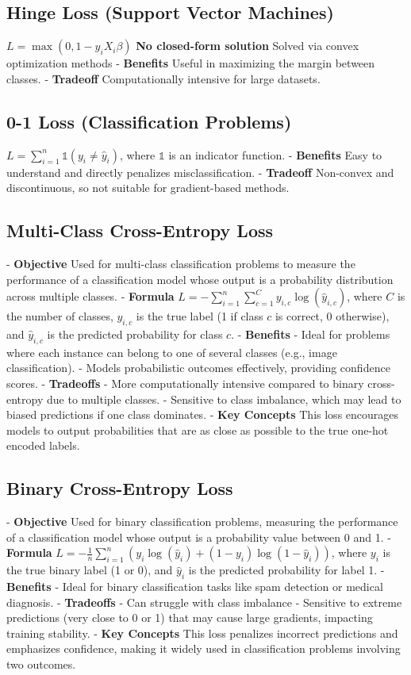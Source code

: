 \documentclass[10pt]{article}
\begin{document}
\begin{multicols}{2}
\subsection*{Hinge Loss (Support Vector Machines)}
$L = \max(0, 1 - y_i X_i \beta)$
\textbf{No closed-form solution} Solved via convex optimization methods
- \textbf{Benefits} Useful in maximizing the margin between classes.
- \textbf{Tradeoff} Computationally intensive for large datasets.

\subsection*{0-1 Loss (Classification Problems)}
$L = \sum_{i=1}^{n} \mathbb{1}(y_i \neq \hat{y}_i)$, where $\mathbb{1}$ is an indicator function.
- \textbf{Benefits} Easy to understand and directly penalizes misclassification.
- \textbf{Tradeoff} Non-convex and discontinuous, so not suitable for gradient-based methods.

\subsection*{Multi-Class Cross-Entropy Loss}
- \textbf{Objective} Used for multi-class classification problems to measure the performance of a classification model whose output is a probability distribution across multiple classes.
- \textbf{Formula} $L = -\sum_{i=1}^{n} \sum_{c=1}^{C} y_{i,c} \log(\hat{y}_{i,c})$, where $C$ is the number of classes, $y_{i,c}$ is the true label (1 if class $c$ is correct, 0 otherwise), and $\hat{y}_{i,c}$ is the predicted probability for class $c$.
- \textbf{Benefits} 
  - Ideal for problems where each instance can belong to one of several classes (e.g., image classification).
  - Models probabilistic outcomes effectively, providing confidence scores.
- \textbf{Tradeoffs} 
  - More computationally intensive compared to binary cross-entropy due to multiple classes.
  - Sensitive to class imbalance, which may lead to biased predictions if one class dominates.
- \textbf{Key Concepts} This loss encourages models to output probabilities that are as close as possible to the true one-hot encoded labels.

\subsection*{Binary Cross-Entropy Loss}
- \textbf{Objective} Used for binary classification problems, measuring the performance of a classification model whose output is a probability value between 0 and 1.
- \textbf{Formula} $L = -\frac{1}{n} \sum_{i=1}^{n} \left( y_i \log(\hat{y}_i) + (1 - y_i) \log(1 - \hat{y}_i) \right)$, where $y_i$ is the true binary label (1 or 0), and $\hat{y}_i$ is the predicted probability for label 1.
- \textbf{Benefits}
  - Ideal for binary classification tasks like spam detection or medical diagnosis.
- \textbf{Tradeoffs}
  - Can struggle with class imbalance
  - Sensitive to extreme predictions (very close to 0 or 1) that may cause large gradients, impacting training stability.
- \textbf{Key Concepts} This loss penalizes incorrect predictions and emphasizes confidence, making it widely used in classification problems involving two outcomes.


\end{multicols}
\end{document}
